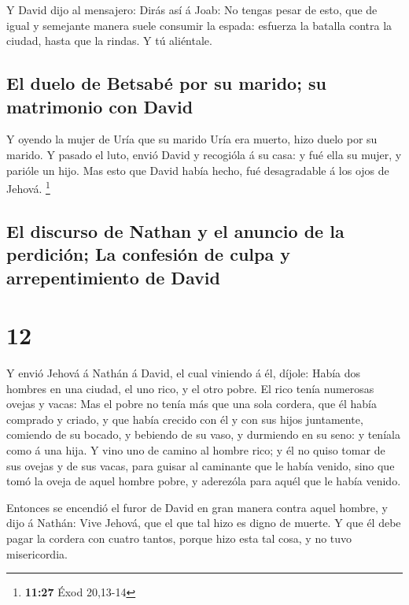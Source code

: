  Y David dijo al mensajero: Dirás así á Joab: No tengas
pesar de esto, que de igual y semejante manera suele consumir la espada:
esfuerza la batalla contra la ciudad, hasta que la rindas. Y tú
aliéntale.

\hypertarget{el-duelo-de-betsabuxe9-por-su-marido-su-matrimonio-con-david}{%
\subsection{El duelo de Betsabé por su marido; su matrimonio con
David}\label{el-duelo-de-betsabuxe9-por-su-marido-su-matrimonio-con-david}}

 Y oyendo la mujer de Uría que su marido Uría era muerto,
hizo duelo por su marido.  Y pasado el luto, envió David y
recogióla á su casa: y fué ella su mujer, y parióle un hijo. Mas esto
que David había hecho, fué desagradable á los ojos de Jehová.
\footnote{\textbf{11:27} Éxod 20,13-14}

\hypertarget{el-discurso-de-nathan-y-el-anuncio-de-la-perdiciuxf3n-la-confesiuxf3n-de-culpa-y-arrepentimiento-de-david}{%
\subsection{El discurso de Nathan y el anuncio de la perdición; La
confesión de culpa y arrepentimiento de
David}\label{el-discurso-de-nathan-y-el-anuncio-de-la-perdiciuxf3n-la-confesiuxf3n-de-culpa-y-arrepentimiento-de-david}}

\hypertarget{section-11}{%
\section{12}\label{section-11}}

 Y envió Jehová á Nathán á David, el cual viniendo á él,
díjole: Había dos hombres en una ciudad, el uno rico, y el otro pobre.
 El rico tenía numerosas ovejas y vacas:  Mas el
pobre no tenía más que una sola cordera, que él había comprado y criado,
y que había crecido con él y con sus hijos juntamente, comiendo de su
bocado, y bebiendo de su vaso, y durmiendo en su seno: y teníala como á
una hija.  Y vino uno de camino al hombre rico; y él no
quiso tomar de sus ovejas y de sus vacas, para guisar al caminante que
le había venido, sino que tomó la oveja de aquel hombre pobre, y
aderezóla para aquél que le había venido.

 Entonces se encendió el furor de David en gran manera
contra aquel hombre, y dijo á Nathán: Vive Jehová, que el que tal hizo
es digno de muerte.  Y que él debe pagar la cordera con
cuatro tantos, porque hizo esta tal cosa, y no tuvo misericordia.


